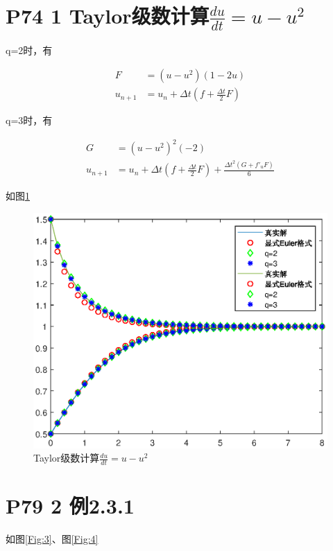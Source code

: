 \documentclass{article}%
\begin{document}
\section{P74 1 Taylor级数计算$\frac{du}{dt}=u-u^2$}

q=2时，有

\begin{align*}
F & =\left ( u-u^2 \right )\left ( 1-2 u \right ) \\
u_{n+1} & =u_{n}+\Delta t \left ( f+\frac{\Delta t}{2} F\right ) 
\end{align*}

q=3时，有

\begin{align*}
G & =\left ( u-u^2 \right )^{2}\left ( -2 \right ) \\
u_{n+1} & =u_{n}+\Delta t \left ( f+\frac{\Delta t}{2} F\right ) +\frac{\Delta t^2 \left ( G+f'_{u}F \right )}{6}
\end{align*}

如图\ref{Fig:2}

\begin{figure}
	\includegraphics[width=1\linewidth]{week4_4_1.eps}
	\caption{Taylor级数计算$\frac{du}{dt}=u-u^2$}  
	\label{Fig:2}
\end{figure}

\section{P79 2 例2.3.1}

如图\ref{Fig:3}、图\ref{Fig:4}
\end{document}
